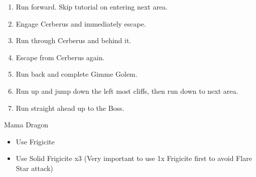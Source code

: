 \begin{enumerate}[resume]
	\item Run forward.  Skip tutorial on entering next area.
	\item Engage Cerberus and immediately escape.
	\item Run through Cerberus and  behind it.
	\item Escape from Cerberus again.
	\item Run back and complete Gimme Golem.
	\item Run up and jump down the left most cliffs, then run down to next area.
	\item Run straight ahead up to the Boss.
\end{enumerate}
\begin{battle}[]{Mama Dragon}
	\begin{itemize}
		\item Use Frigicite
		\item Use Solid Frigicite x3 (Very important to use 1x Frigicite first to avoid Flare Star attack)
	\end{itemize}
\end{battle}